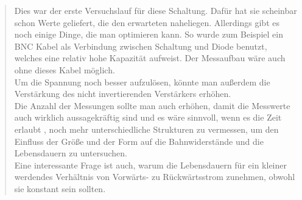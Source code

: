 \begin{quote}
     Dies war der erste Versuchslauf für diese Schaltung. Dafür hat sie
     scheinbar schon Werte geliefert, die den erwarteten naheliegen. Allerdings
     gibt es noch einige Dinge, die man optimieren kann. So wurde zum Beispiel
     ein BNC Kabel als Verbindung zwischen Schaltung und Diode benutzt, welches
     eine relativ hohe Kapazität aufweist. Der Messaufbau wäre auch ohne dieses
     Kabel möglich.\\
     Um die Spannung noch besser aufzulösen, könnte man außerdem die
     Verstärkung des nicht invertierenden Verstärkers erhöhen.\\
     Die Anzahl der Messungen sollte man auch erhöhen, damit die Messwerte auch
     wirklich aussagekräftig sind und es wäre sinnvoll, wenn es die Zeit erlaubt
     , noch mehr unterschiedliche Strukturen zu vermessen, um den Einfluss der
     Größe und der Form auf die Bahnwiderstände und die Lebensdauern zu
     untersuchen.\\
     Eine interessante Frage ist auch, warum die Lebensdauern für ein kleiner
     werdendes Verhältnis von Vorwärts- zu Rückwärtsstrom zunehmen, obwohl sie
     konstant sein sollten.


\end{quote} %


\newpage

